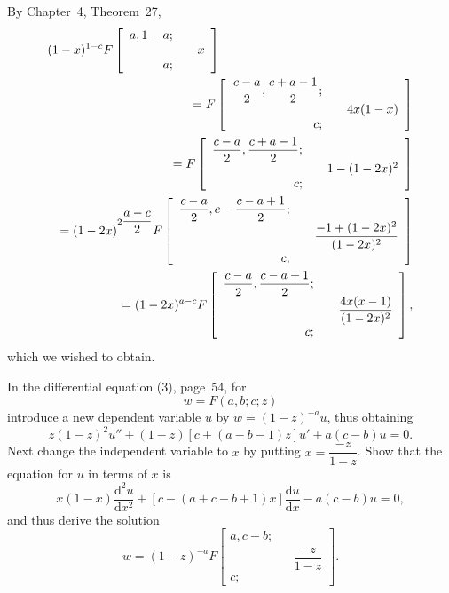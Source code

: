 \begin{solution}
By Chapter~4, Theorem~27,
\begin{eqnarray*}
\lefteqn{(1-x)^{1-c} F \left[ \begin{array}{rlr}
a, 1-a; & & \\
& & x \\
a; & & 
\end{array} \right]} \\
& &= F \left[ \begin{array}{rlr}
\dfrac{c-a}{2}, \dfrac{c+a-1}{2}; & & \\
& & 4x(1-x) \\
c; & & 
\end{array} \right] \\
& &= F \left[ \begin{array}{rlr}
\dfrac{c-a}{2}, \dfrac{c+a-1}{2}; & & \\
& & 1 - (1-2x)^2 \\
c; & & 
\end{array} \right] \\
& &= (1-2x)^{2 \dfrac{a-c}{2}} F \left[ \begin{array}{rlr}
\dfrac{c-a}{2}, c-\dfrac{c-a+1}{2}; & & \\
& & \dfrac{-1 + (1-2x)^2}{(1-2x)^2} \\
c; & & 
\end{array} \right] \\
& &= (1-2x)^{a-c} F \left[ \begin{array}{rlr}
\dfrac{c-a}{2}, \dfrac{c-a+1}{2}; & & \\
& & \dfrac{4x(x-1)}{(1-2x)^2} \\
c; & &
\end{array} \right],
\end{eqnarray*}
which we wished to obtain.
\end{solution}
\begin{problem}\label{problem12chapter4}
In the differential equation (3), page~54, for 
$$w = F(a,b;c;z)$$
introduce a new dependent variable $u$ by $w = (1-z)^{-a}u$, thus obtaining
$$z(1-z)^2u'' + (1-z)[c+(a-b-1)z]u' + a(c-b)u = 0.$$
Next change the independent variable to $x$ by putting $x = \dfrac{-z}{1-z}$. Show that the equation for $u$ in terms of $x$ is
$$x(1-x)\dfrac{\mathrm{d}^2u}{\mathrm{d}x^2} + [ c - (a+c-b+1)x] \dfrac{\mathrm{d}u}{\mathrm{d}x} - a(c-b)u = 0,$$
and thus derive the solution
$$w = (1-z)^{-a} F \left[ \begin{array}{rlr}
a, c-b; & & \\
& & \dfrac{-z}{1-z} \\
c; & &
\end{array} \right].$$
\end{problem}
